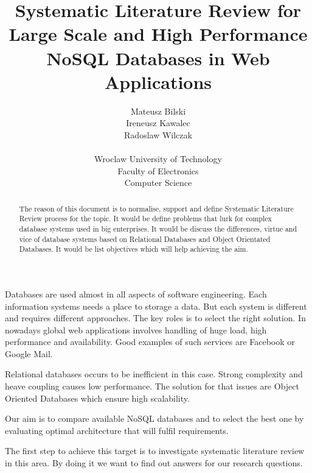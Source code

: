 \documentclass[times, 10pt,twocolumn]{article}
\begin{document}
\title{ Systematic Literature Review
       for Large Scale and High Performance NoSQL Databases in Web Applications}

\author{Mateusz Bilski\\ Ireneusz Kawalec \\ Radoslaw Wilczak\\ \\
Wroclaw University of Technology\\ Faculty of Electronics \\ Computer Science
}

\maketitle
\thispagestyle{empty}

\begin{abstract}  

The reason of this document is to normalise, support and define Systematic Literature Review process for the topic.
It would be define problems that lurk for complex database systems used in big enterprises. 
It would be discuss the differences, virtue and vice of database systems based on Relational Databases and Object Orientated Databases.
It would be list objectives which will help achieving the aim.

\end{abstract} 




Databases are used almost in all aspects of software engineering. Each 
information systems needs a place to storage a data. But each system is different
and requires different approaches. The key roles is to select the right solution.
In nowadays global web applications involves handling of huge load, high performance and
availability. Good examples of such services are Facebook or Google Mail.

Relational databases occurs to be inefficient in this case. Strong complexity and
heave coupling causes low performance. The solution for that issues are Object Oriented
Databases which ensure high scalability.

Our aim is to compare available NoSQL databases and to select the best one by evaluating 
optimal architecture that will fulfil requirements. 

The first step to achieve this target is to investigate systematic literature review in this area.
By doing it we want to find out answers for our research questions.
\end{document}
